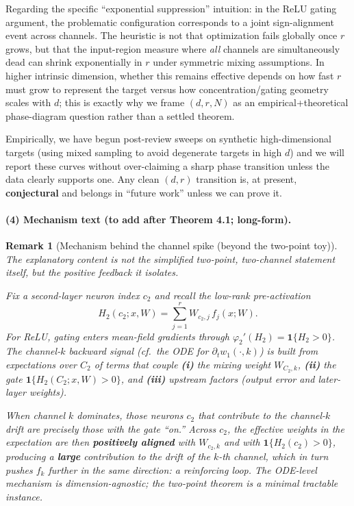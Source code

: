 \documentclass[11pt,a4paper]{article}
\newtheorem{remark}{Remark}
\begin{document}
Regarding the specific ``exponential suppression'' intuition: in the ReLU gating argument, the problematic configuration corresponds to a joint sign-alignment event across channels. The heuristic is not that optimization fails globally once $r$ grows, but that the input-region measure where \emph{all} channels are simultaneously dead can shrink exponentially in $r$ under symmetric mixing assumptions. In higher intrinsic dimension, whether this remains effective depends on how fast $r$ must grow to represent the target versus how concentration/gating geometry scales with $d$; this is exactly why we frame $(d,r,N)$ as an empirical+theoretical phase-diagram question rather than a settled theorem.

Empirically, we have begun post-review sweeps on synthetic high-dimensional targets (using mixed sampling to avoid degenerate targets in high $d$) and we will report these curves without over-claiming a sharp phase transition unless the data clearly supports one. Any clean $(d,r)$ transition is, at present, \textbf{conjectural} and belongs in ``future work'' unless we can prove it.

\paragraph{(4) Mechanism text (to add after Theorem 4.1; long-form).}
\begin{remark}[Mechanism behind the channel spike (beyond the two-point toy)]
\label{rem:feature-learning-mechanism}
The explanatory content is not the simplified two-point, two-channel statement itself, but the \emph{positive feedback} it isolates.

Fix a second-layer neuron index $c_2$ and recall the low-rank pre-activation
\[
  H_2(c_2;x,W)=\sum_{j=1}^r W_{c_2,j}\,f_j(x;W).
\]
For ReLU, gating enters mean-field gradients through $\varphi_2'(H_2)=\mathbf{1}\{H_2>0\}$. The channel-$k$ backward signal (cf.\ the ODE for $\partial_t w_1(\cdot,k)$) is built from expectations over $C_2$ of terms that couple \textbf{(i)} the mixing weight $W_{C_2,k}$, \textbf{(ii)} the gate $\mathbf{1}\{H_2(C_2;x,W)>0\}$, and \textbf{(iii)} upstream factors (output error and later-layer weights).

When channel $k$ \emph{dominates}, those neurons $c_2$ that contribute to the channel-$k$ drift are precisely those with the gate ``on.'' Across $c_2$, the effective weights in the expectation are then \textbf{positively aligned} with $W_{c_2,k}$ and with $\mathbf{1}\{H_2(c_2)>0\}$, producing a \textbf{large} contribution to the drift of the $k$-th channel, which in turn pushes $f_k$ further in the same direction: a \emph{reinforcing loop}. The ODE-level mechanism is dimension-agnostic; the two-point theorem is a minimal tractable instance.
\end{remark}
\end{document}
